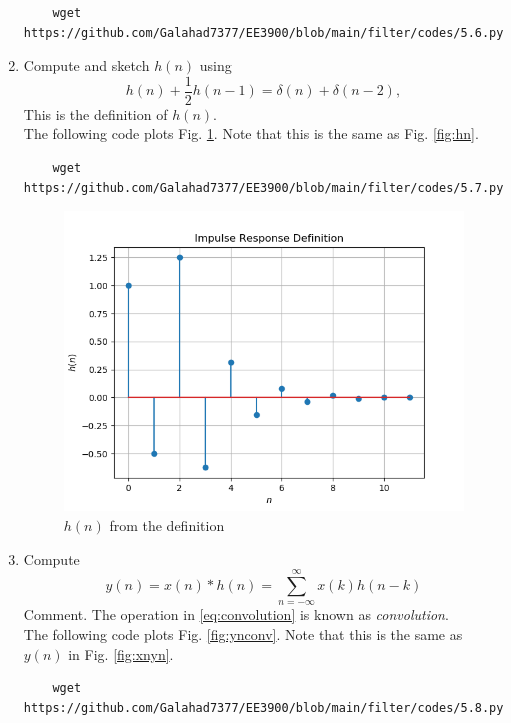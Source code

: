 \documentclass[journal,12pt,twocolumn]{IEEEtran}
\renewcommand\thesection{\arabic{section}}
\begin{document}
\begin{enumerate}[label=\thesection.\arabic*]
\solution
\begin{lstlisting}
    wget https://github.com/Galahad7377/EE3900/blob/main/filter/codes/5.6.py
\end{lstlisting}
\item 
Compute and sketch $h(n)$ using 
\begin{equation}
\label{eq:iir_filter_h}
h(n) + \frac{1}{2}h(n-1) = \delta(n) + \delta(n-2), 
\end{equation}
%
This is the definition of $h(n)$.
\\
\solution The following code plots Fig. \ref{fig:hndef}. Note that this is the same as Fig. 
\ref{fig:hn}. 
%
\begin{lstlisting}
    wget https://github.com/Galahad7377/EE3900/blob/main/filter/codes/5.7.py
\end{lstlisting}
\begin{figure}[!ht]
\centering
\includegraphics[width=\columnwidth]{figs/5.7.png}
\caption{$h(n)$ from the definition}
\label{fig:hndef}
\end{figure}
%
\item Compute 
%
\begin{equation}
\label{eq:convolution}
y(n) = x(n)*h(n) = \sum_{n=-\infty}^{\infty}x(k)h(n-k)
\end{equation}
%
Comment. The operation in \eqref{eq:convolution} is known as
{\em convolution}.
%
\\
\solution The following code plots Fig. \ref{fig:ynconv}. Note that this is the same as 
$y(n)$ in  Fig. 
\ref{fig:xnyn}. 
%
\begin{lstlisting}
    wget https://github.com/Galahad7377/EE3900/blob/main/filter/codes/5.8.py

\end{lstlisting}
\end{enumerate}
\end{document}

